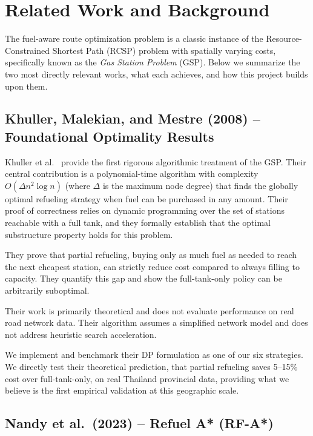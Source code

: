 \chapter{Related Work and Background}

The fuel-aware route optimization problem is a classic instance of the
Resource-Constrained Shortest Path (RCSP) problem with spatially varying costs, specifically
known as the \textit{Gas Station Problem} (GSP).
Below we summarize the two most directly relevant works, what each achieves, and how this
project builds upon them.

\section{Khuller, Malekian, and Mestre (2008) -- Foundational Optimality Results}

Khuller et al.~\cite{khuller2008} provide the first rigorous algorithmic treatment of the GSP.
Their central contribution is a polynomial-time algorithm with complexity
$O(\Delta n^{2} \log n)$ (where $\Delta$ is the maximum node degree) that finds the globally
optimal refueling strategy when fuel can be purchased in any amount.
Their proof of correctness relies on dynamic programming over the set of stations reachable
with a full tank, and they formally establish that the optimal substructure property holds for
this problem.

They prove that partial refueling, buying only as much fuel as needed to reach the next
cheapest station, can strictly reduce cost compared to always filling to capacity.
They quantify this gap and show the full-tank-only policy can be arbitrarily suboptimal.

Their work is primarily theoretical and does not evaluate performance on real road network
data.
Their algorithm assumes a simplified network model and does not address heuristic search
acceleration.

We implement and benchmark their DP formulation as one of our six strategies.
We directly test their theoretical prediction, that partial refueling saves 5--15\% cost over
full-tank-only, on real Thailand provincial data, providing what we believe is the first
empirical validation at this geographic scale.

\section{Nandy et al.\ (2023) -- Refuel A* (RF-A*)}

